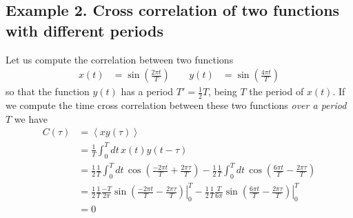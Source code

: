 \documentclass{article}
\begin{document}
\subsection*{Example 2. Cross correlation of two functions with different periods}
Let us compute the correlation between two functions
\begin{align}
  x(t)&= \sin \left( \frac{2 \pi t}{T} \right)\,\quad &  y(t)&= \sin \left( \frac{4 \pi t}{T} \right)
\end{align}
so that the function $y(t)$ has a period $T'= \frac{1}{2}T$, being $T$ the period of $x(t)$. If we compute the time cross correlation between these two functions {\em over a period} $T$ we have
\begin{align}
  C(\tau) &= \left< x y(\tau) \right> \\
          &= \frac{1}{T}\int_0^{T} dt\, x(t) y(t-\tau) \\
          &= \frac{1}{2} \frac{1}{T} \int_0^T dt\, \cos\left( \frac{-2\pi t}{T} + \frac{2 \pi \tau}{T} \right)
           - \frac{1}{2} \frac{1}{T} \int_0^T dt\, \cos\left( \frac{ 6\pi t}{T} - \frac{2 \pi \tau}{T} \right) \\
           &=\frac{1}{2} \frac{1}{T} \left. \frac{-T}{2\pi} \sin \left(  \frac{-2\pi t}{T}- \frac{2 \pi \tau}{T} \right) \right|_{0}^{T}
             - \frac{1}{2} \frac{1}{T} \left. \frac{T}{6\pi} \sin \left(  \frac{6\pi t}{T}- \frac{2 \pi \tau}{T} \right) \right|_{0}^{T} \\
           &= 0
\end{align}
\end{document}
